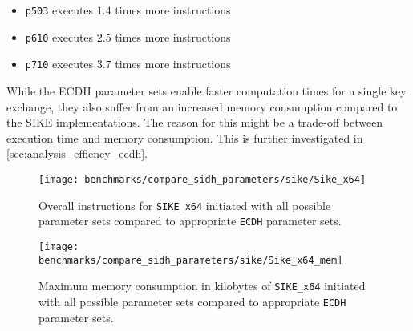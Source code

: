 \begin{itemize}
\itemsep0em 
\item \texttt{p503} executes $1.4$ times more instructions
\item \texttt{p610} executes $2.5$ times more instructions
\item \texttt{p710} executes $3.7$ times more instructions
\end{itemize}
While the \gls{ECDH} parameter sets enable faster computation times for a single key exchange, they also suffer from an increased memory consumption compared to the \gls{SIKE} implementations. The reason for this might be a trade-off between execution time and memory consumption. This is further investigated in \autoref{sec:analysis_effiency_ecdh}.

\begin{figure}[H]
  \centering
  \texttt{[image: benchmarks/compare\_sidh\_parameters/sike/Sike\_x64]}
  \caption[Overall instructions for all parameter sets via \texttt{SIKE\_x64} compared to \texttt{ECDH}]
  {Overall instructions for \texttt{SIKE\_x64} initiated with all possible parameter sets compared to appropriate \texttt{ECDH} parameter sets.}
  \label{fig:results_all_curves_sike}
\end{figure}

\begin{figure}[H]
  \centering
  \texttt{[image: benchmarks/compare\_sidh\_parameters/sike/Sike\_x64\_mem]}
  \caption[Maximum memory consumption for all parameter sets via \texttt{SIKE\_x64}  compared to \texttt{ECDH}]
  {Maximum memory consumption in kilobytes of \texttt{SIKE\_x64} initiated with all possible parameter sets compared to appropriate \texttt{ECDH} parameter sets.}
  \label{fig:results_all_curves_sike_mem}
\end{figure}

